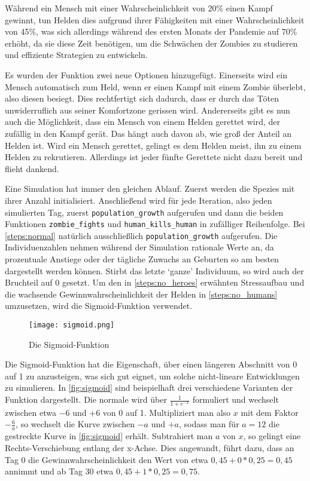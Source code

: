 \begin{enumerate}[1.]
            Während ein Mensch mit einer Wahrscheinlichkeit von 20\% einen Kampf gewinnt, tun Helden dies aufgrund ihrer Fähigkeiten mit einer Wahrscheinlichkeit von 45\%, was sich allerdings während des ersten Monats der Pandemie auf 70\% erhöht, da sie diese Zeit benötigen, um die Schwächen der Zombies zu studieren und effiziente Strategien zu entwickeln.

            Es wurden der Funktion zwei neue Optionen hinzugefügt. Einerseits wird ein Mensch automatisch zum Held, wenn er einen Kampf mit einem Zombie überlebt, also diesen besiegt. Dies rechtfertigt sich dadurch, dass er durch das Töten unwiderruflich aus seiner Komfortzone gerissen wird. Andererseits gibt es nun auch die Möglichkeit, dass ein Mensch von einem Helden gerettet wird, der zufällig in den Kampf gerät. Das hängt auch davon ab, wie groß der Anteil an Helden ist. Wird ein Mensch gerettet, gelingt es dem Helden meist, ihn zu einem Helden zu rekrutieren. Allerdings ist jeder fünfte Gerettete nicht dazu bereit und flieht dankend.
            \label{steps:no_humans}
    \end{enumerate}
    Eine Simulation hat immer den gleichen Ablauf. Zuerst werden die Spezies mit ihrer Anzahl initialisiert. Anschließend wird für jede Iteration, also jeden simulierten Tag, zuerst \texttt{population\_growth} aufgerufen und dann die beiden Funktionen \texttt{zombie\_fights} und \texttt{human\_kills\_human} in zufälliger Reihenfolge. Bei \autoref{steps:normal} natürlich ausschließlich \texttt{population\_growth} aufgerufen. Die Individuenzahlen nehmen während der Simulation rationale Werte an, da prozentuale Anstiege oder der tägliche Zuwachs an Geburten so am besten dargestellt werden können. Stirbt das letzte `ganze' Individuum, so wird auch der Bruchteil auf 0 gesetzt. 
    \newpage
    Um den in \autoref{steps:no_heroes} erwähnten Stressaufbau und die wachsende Gewinnwahrscheinlichkeit der Helden in \autoref{steps:no_humans} umzusetzen, wird die Sigmoid-Funktion verwendet.\par
    \begin{figure}[h]
        \centering
        \texttt{[image: sigmoid.png]}
        \caption{Die Sigmoid-Funktion}
        \label{fig:sigmoid}
    \end{figure}
    Die Sigmoid-Funktion hat die Eigenschaft, über einen längeren Abschnitt von 0 auf 1 zu anzusteigen, was sich gut eignet, um solche nicht-lineare Entwicklungen zu simulieren. In \autoref{fig:sigmoid} sind beispielhaft drei verschiedene Varianten der Funktion dargestellt. Die normale wird über \(\frac{1}{1 + e^{-x}}\) formuliert und wechselt zwischen etwa \(-6\) und \(+6\) von 0 auf 1. Multipliziert man also \(x\) mit dem Faktor \(-\frac{6}{a}\), so wechselt die Kurve zwischen \(-a\) und \(+a\), sodass man für \(a=12\) die gestreckte Kurve in \autoref{fig:sigmoid} erhält. Subtrahiert man \(a\) von \(x\), so gelingt eine Rechts-Verschiebung entlang der x-Achse. Dies angewandt, führt dazu, dass an Tag 0 die Gewinnwahrscheinlichkeit den Wert von etwa \(0,45 + 0 * 0,25 = 0,45\) annimmt und ab Tag 30 etwa \(0,45 + 1 * 0,25 = 0,75\).

